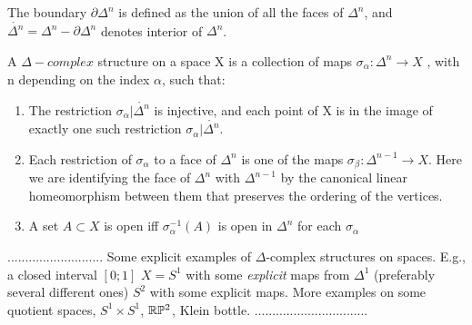 \documentclass[11pt,a4paper]{report}
\begin{document}
             The boundary $\partial\Delta^n$ is defined as the union of all the faces of $\Delta^n$, and
             $\mathring{\Delta^n} = \Delta^n - \partial\Delta^n $ denotes interior of $\Delta^n$. 
             
		      \begin{defn}\label{Delta-complex}
		      	A $\Delta-complex$ structure on a space X is a collection of maps $\sigma_\alpha: \Delta^n \rightarrow X $ , with n depending on the index $\alpha$, such that:
                    \begin{enumerate}
                        \item The restriction $\sigma_\alpha | \mathring{\Delta^n}$ is                      injective, and each point of X is in the image of exactly one such restriction $\sigma_\alpha | \mathring{\Delta^n}$.
                        \item Each restriction of $\sigma_\alpha$ to a face of $\Delta^n$ is one of the  maps
                        $\sigma_\beta: \Delta^{n-1} \rightarrow X $. Here we are identifying the face of $\Delta^n$ with $\Delta^{n-1}$ by the canonical linear homeomorphism between them that preserves the ordering of the vertices.
                        \item A set $A \subset X$ is open iff $\sigma^{-1}_{\alpha}(A)$ is open in $\Delta^n$ for each $\sigma_\alpha$
                    \end{enumerate}

		      \end{defn}
		      
		      ...........................
		      Some explicit examples of $\Delta$-complex structures on spaces. E.g., 
		      a closed interval $[0;1]$
		      $X=S^1$ with some \emph{explicit} maps from $\Delta^1$ (preferably several different ones) 
		      $S^2$ with some explicit maps. More examples on some quotient spaces, $S^1\times S^1$, $\mathbb{R}\mathbb{P}^2$, Klein bottle.
		      ................................
		      
\end{document}

